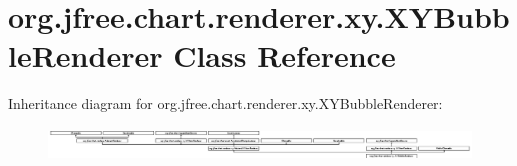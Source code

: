 \hypertarget{classorg_1_1jfree_1_1chart_1_1renderer_1_1xy_1_1_x_y_bubble_renderer}{}\section{org.\+jfree.\+chart.\+renderer.\+xy.\+X\+Y\+Bubble\+Renderer Class Reference}
\label{classorg_1_1jfree_1_1chart_1_1renderer_1_1xy_1_1_x_y_bubble_renderer}
Inheritance diagram for org.\+jfree.\+chart.\+renderer.\+xy.\+X\+Y\+Bubble\+Renderer\+:\begin{figure}[H]
\begin{center}
\leavevmode
\includegraphics[height=0.883281cm]{classorg_1_1jfree_1_1chart_1_1renderer_1_1xy_1_1_x_y_bubble_renderer}
\end{center}
\end{figure}
